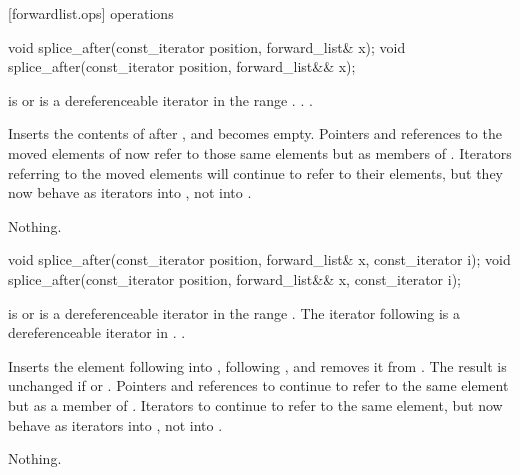 [forwardlist.ops]{ operations}

%
%
\begin{itemdecl}
void splice_after(const_iterator position, forward_list& x);
void splice_after(const_iterator position, forward_list&& x);
\end{itemdecl}

\begin{itemdescr}
\pnum
\requires {} is  or is a dereferenceable
iterator in the range .
.
.

\pnum
\effects Inserts the contents of  after
, and  becomes empty. Pointers and references to the moved
elements of  now refer to those same elements but as members of .
Iterators referring to the moved elements will continue to refer to their elements, but
they now behave as iterators into , not into .

\pnum
\throws Nothing.

\pnum
\complexity {}
\end{itemdescr}

%
%
\begin{itemdecl}
void splice_after(const_iterator position, forward_list& x, const_iterator i);
void splice_after(const_iterator position, forward_list&& x, const_iterator i);
\end{itemdecl}

\begin{itemdescr}
\pnum
\requires {} is  or is a dereferenceable
iterator in the range .
The iterator following  is a dereferenceable iterator in .
.

\pnum
\effects Inserts the element following  into , following
, and removes it from .
The result is unchanged if  or . Pointers
and references to  continue to refer to the same element but as a member of
. Iterators to  continue to refer to
the same element, but now behave as iterators into , not into .

\pnum
\throws Nothing.

\pnum
\complexity {}
\end{itemdescr}

